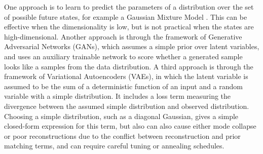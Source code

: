 \documentclass{article}
\begin{document}
One approach is to learn to predict the parameters of a distribution over the set of possible future states, for example a Gaussian Mixture Model \citep{mixture-density-networks}.
This can be effective when the dimensionality is low, but is not practical when the states are high-dimensional.
Another approach is through the framework of Generative Adversarial Networks \citep{GAN} (GANs), which assumes a simple prior over latent variables, and uses an auxiliary trainable network to score whether a generated sample looks like a samples from the data distribution.
A third approach is through the framework of Variational Autoencoders \citep{VAE} (VAEs), in which the latent variable is assumed to be the sum of a deterministic function of an input and a random variable with a simple distribution. It includes a loss term measuring the divergence between the assumed simple distribution and observed distribution.
Choosing a simple distribution, such as a diagonal Gaussian, gives a simple closed-form expression for this term, but also can also cause either mode collapse or poor reconstructions due to the conflict between reconstruction and prior matching terms, and can require careful tuning or annealing schedules.
\end{document}
